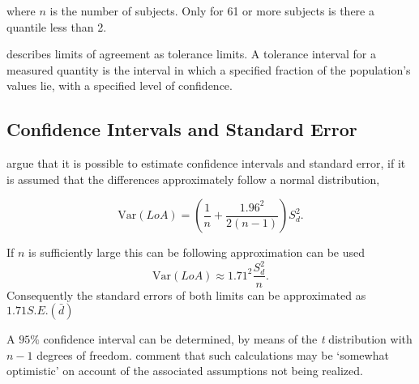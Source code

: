 \documentclass{report}
\begin{document}
	\noindent where $n$ is the number of subjects. Only for 61 or more
	subjects is there a quantile less than 2.
	
	\citet{luiz} describes limits of agreement as tolerance limits. A
	tolerance interval for a measured quantity is the interval in
	which a specified fraction of the population's values lie, with a
	specified level of confidence.
	
	
	\subsection{Confidence Intervals and Standard Error}
	\citet*{BA99} argue that it is possible to estimate confidence
	intervals and standard error, if it is assumed that the
	differences approximately follow a normal distribution,
	
	\begin{equation}
	\mbox{Var}(LoA) = (\frac{1}{n}+\frac{1.96^{2}}{2(n-1)})S_{d}^{2}.
	\end{equation}
	
	If $n$ is sufficiently large this can be following approximation
	can be used
	\begin{equation}
	\mbox{Var}(LoA) \approx 1.71^{2}\frac{S_{d}^{2}}{n}.
	\end{equation}
	Consequently the standard errors of both limits can be
	approximated as $1.71 S.E.(\bar{d})$
	
	A $95\%$ confidence interval can be determined, by means of the
	\emph{t} distribution with $n-1$ degrees of freedom. \citet*{BA99} comment that such calculations  may be `somewhat
	optimistic' on account of the associated assumptions not being
	realized.
	
	
	
\end{document}
